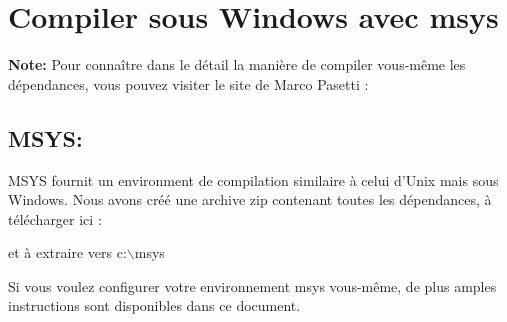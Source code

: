 %
%
%
%
%
%
%

\section{Compiler sous Windows avec msys}\label{sec:install_windows}
\textbf{Note:} Pour connaître dans le détail la manière de compiler vous-même
les dépendances, vous pouvez visiter le site de Marco Pasetti :


\subsection{MSYS:}
MSYS fournit un environment de compilation similaire à celui d'Unix mais sous
Windows. Nous avons créé une archive zip contenant toutes les dépendances, à
télécharger ici : 


et à extraire vers c:$\backslash$msys

Si vous voulez configurer votre environnement msys vous-même, de plus amples
instructions sont disponibles dans ce document.

